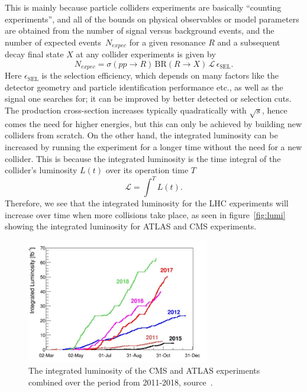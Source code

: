 This is mainly because particle colliders experiments are basically ``counting experiments'', and all of the bounds on physical observables or model parameters are obtained from the number of signal versus background events, and the number of expected events~$N_{expec}$ for a given resonance $R$ and a subsequent decay final state $X$ at any collider experiments is given by
\begin{equation}
	N_{expec} = \sigma(pp\to R) \, \mathrm{BR}(R \to X)\,\mathscr{L}  \, \epsilon_{\mathrm{SEL}}.
	\label{nevents}
\end{equation}
Here $ \epsilon_{\mathrm{SEL}}$ is the selection efficiency, which depends on many factors like the detector geometry and particle identification performance etc., as well as the signal one searches for; it can be improved by better detected or selection cuts. The production cross-section increases typically quadratically with $\sqrt {s}$, hence comes the need for higher energies, but this can only be achieved by building new colliders from scratch. On the other hand, the integrated luminosity can be increased by running the experiment for a longer time without the need for a new collider. This is because the integrated luminosity is the time integral of the collider's luminosity $L(t)$ over its operation time $T$
\begin{equation}
	\mathscr{L} = \int^{T} L(t) .
\end{equation}
Therefore, we see that the integrated luminosity for the LHC experiments will increase over time when more collisions take place, as seen in figure~\autoref{fig:lumi} showing the integrated luminosity for ATLAS and CMS experiments. 
\begin{figure}[t!]
	\begin{center}
		\includegraphics[width=8cm]{figures/lhc_lumi}
		\caption{The integrated luminosity of the CMS and ATLAS experiments combined over the period from 2011-2018, source~\cite{lhcpreformance}.  \label{fig:lumi} }
	\end{center}
\end{figure}
